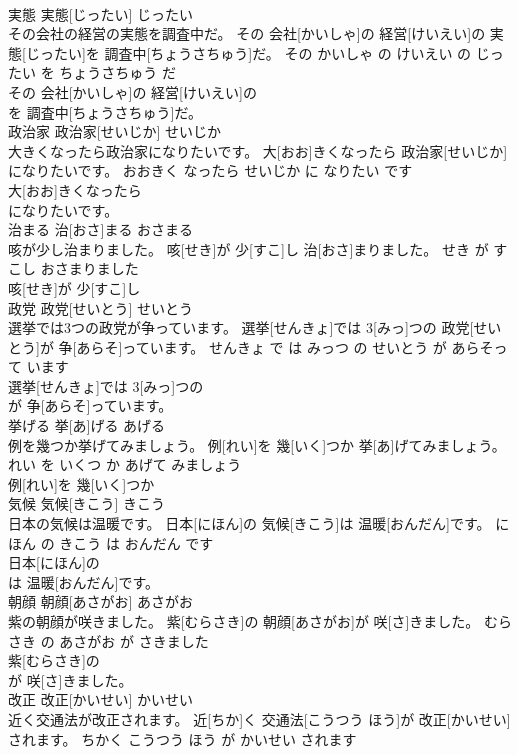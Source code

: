 \documentclass[8pt]{extreport}
\begin{document}
\begin{CJK}{UTF8}{min}
\\	実態	実態[じったい]	じったい	
\\	その会社の経営の実態を調査中だ。	その 会社[かいしゃ]の 経営[けいえい]の 実態[じったい]を 調査中[ちょうさちゅう]だ。	その かいしゃ の けいえい の じったい を ちょうさちゅう だ	
\\	その 会社[かいしゃ]の 経営[けいえい]の
\\	を 調査中[ちょうさちゅう]だ。			
\\	政治家	政治家[せいじか]	せいじか	
\\	大きくなったら政治家になりたいです。	大[おお]きくなったら 政治家[せいじか]になりたいです。	おおきく なったら せいじか に なりたい です	
\\	大[おお]きくなったら
\\	になりたいです。			
\\	治まる	治[おさ]まる	おさまる	
\\	咳が少し治まりました。	咳[せき]が 少[すこ]し 治[おさ]まりました。	せき が すこし おさまりました	
\\	咳[せき]が 少[すこ]し
\\	政党	政党[せいとう]	せいとう	
\\	選挙では3つの政党が争っています。	選挙[せんきょ]では 3[みっ]つの 政党[せいとう]が 争[あらそ]っています。	せんきょ で は みっつ の せいとう が あらそって います	
\\	選挙[せんきょ]では 3[みっ]つの
\\	が 争[あらそ]っています。			
\\	挙げる	挙[あ]げる	あげる	
\\	例を幾つか挙げてみましょう。	例[れい]を 幾[いく]つか 挙[あ]げてみましょう。	れい を いくつ か あげて みましょう	
\\	例[れい]を 幾[いく]つか
\\	気候	気候[きこう]	きこう	
\\	日本の気候は温暖です。	日本[にほん]の 気候[きこう]は 温暖[おんだん]です。	にほん の きこう は おんだん です	
\\	日本[にほん]の
\\	は 温暖[おんだん]です。			
\\	朝顔	朝顔[あさがお]	あさがお	
\\	紫の朝顔が咲きました。	紫[むらさき]の 朝顔[あさがお]が 咲[さ]きました。	むらさき の あさがお が さきました	
\\	紫[むらさき]の
\\	が 咲[さ]きました。			
\\	改正	改正[かいせい]	かいせい	
\\	近く交通法が改正されます。	近[ちか]く 交通法[こうつう ほう]が 改正[かいせい]されます。	ちかく こうつう ほう が かいせい されます	

\end{CJK}
\end{document}
